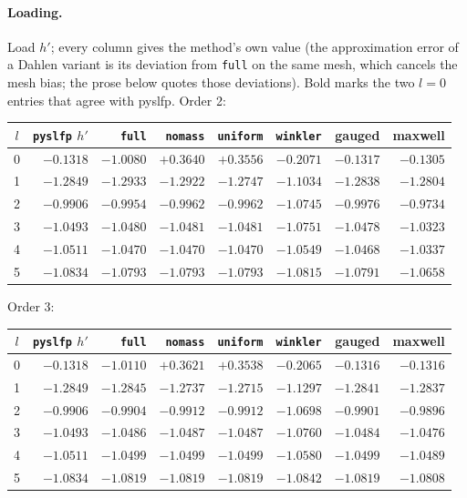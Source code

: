 \documentclass[11pt]{article}
\numberwithin{equation}{section}
\newcommand{\code}[1]{\texttt{#1}}
\begin{document}
\paragraph{Loading.} Load $h'$; every column gives the method's own
value (the approximation error of a Dahlen variant is its deviation
from \code{full} on the same mesh, which cancels the mesh bias; the
prose below quotes those deviations). Bold marks the two $l=0$ entries
that agree with pyslfp. Order 2:
\begin{center}
\small
\begin{tabular}{@{}crrrrrrr@{}}
\toprule
$l$ & \code{pyslfp} $h'$ & \code{full} & \code{nomass} & \code{uniform} & \code{winkler} & gauged & maxwell \\
\midrule
0 & $-0.1318$ & $-1.0080$ & $+0.3640$ & $+0.3556$ & $-0.2071$ & $\mathbf{-0.1317}$ & $\mathbf{-0.1305}$ \\
1 & $-1.2849$ & $-1.2933$ & $-1.2922$ & $-1.2747$ & $-1.1034$ & $-1.2838$ & $-1.2804$ \\
2 & $-0.9906$ & $-0.9954$ & $-0.9962$ & $-0.9962$ & $-1.0745$ & $-0.9976$ & $-0.9734$ \\
3 & $-1.0493$ & $-1.0480$ & $-1.0481$ & $-1.0481$ & $-1.0751$ & $-1.0478$ & $-1.0323$ \\
4 & $-1.0511$ & $-1.0470$ & $-1.0470$ & $-1.0470$ & $-1.0549$ & $-1.0468$ & $-1.0337$ \\
5 & $-1.0834$ & $-1.0793$ & $-1.0793$ & $-1.0793$ & $-1.0815$ & $-1.0791$ & $-1.0658$ \\
\bottomrule
\end{tabular}
\end{center}
Order 3:
\begin{center}
\small
\begin{tabular}{@{}crrrrrrr@{}}
\toprule
$l$ & \code{pyslfp} $h'$ & \code{full} & \code{nomass} & \code{uniform} & \code{winkler} & gauged & maxwell \\
\midrule
0 & $-0.1318$ & $-1.0110$ & $+0.3621$ & $+0.3538$ & $-0.2065$ & $\mathbf{-0.1316}$ & $\mathbf{-0.1316}$ \\
1 & $-1.2849$ & $-1.2845$ & $-1.2737$ & $-1.2715$ & $-1.1297$ & $-1.2841$ & $-1.2837$ \\
2 & $-0.9906$ & $-0.9904$ & $-0.9912$ & $-0.9912$ & $-1.0698$ & $-0.9901$ & $-0.9896$ \\
3 & $-1.0493$ & $-1.0486$ & $-1.0487$ & $-1.0487$ & $-1.0760$ & $-1.0484$ & $-1.0476$ \\
4 & $-1.0511$ & $-1.0499$ & $-1.0499$ & $-1.0499$ & $-1.0580$ & $-1.0499$ & $-1.0489$ \\
5 & $-1.0834$ & $-1.0819$ & $-1.0819$ & $-1.0819$ & $-1.0842$ & $-1.0819$ & $-1.0808$ \\
\bottomrule
\end{tabular}
\end{center}
\end{document}
